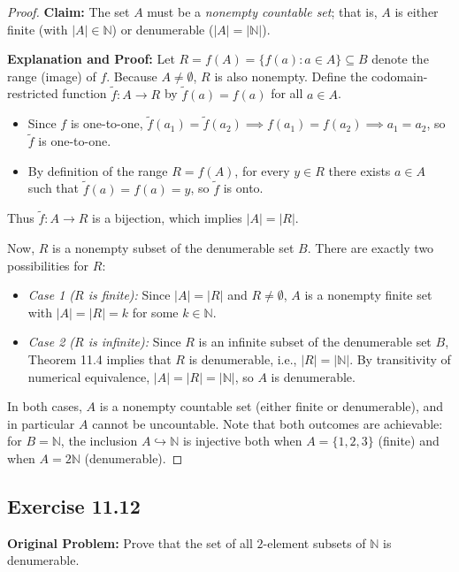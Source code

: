 \documentclass[11pt, letterpaper]{article}
\theoremstyle{definition}
\theoremstyle{remark}
\begin{document}
\begin{proof}
\textbf{Claim:} The set $A$ must be a \emph{nonempty countable set}; that is, $A$ is either finite (with $|A| \in \mathbb{N}$) or denumerable ($|A| = |\mathbb{N}|$).

\textbf{Explanation and Proof:} Let $R = f(A) = \{f(a) : a \in A\} \subseteq B$ denote the range (image) of $f$. Because $A \neq \emptyset$, $R$ is also nonempty. Define the codomain-restricted function $\tilde{f} : A \to R$ by $\tilde{f}(a) = f(a)$ for all $a \in A$.
\begin{itemize}
    \item Since $f$ is one-to-one, $\tilde{f}(a_1) = \tilde{f}(a_2) \implies f(a_1) = f(a_2) \implies a_1 = a_2$, so $\tilde{f}$ is one-to-one.
    \item By definition of the range $R = f(A)$, for every $y \in R$ there exists $a \in A$ such that $\tilde{f}(a) = f(a) = y$, so $\tilde{f}$ is onto.
\end{itemize}
Thus $\tilde{f} : A \to R$ is a bijection, which implies $|A| = |R|$.

Now, $R$ is a nonempty subset of the denumerable set $B$. There are exactly two possibilities for $R$:
\begin{itemize}
    \item \emph{Case 1 ($R$ is finite):} Since $|A| = |R|$ and $R \neq \emptyset$, $A$ is a nonempty finite set with $|A| = |R| = k$ for some $k \in \mathbb{N}$.
    \item \emph{Case 2 ($R$ is infinite):} Since $R$ is an infinite subset of the denumerable set $B$, Theorem 11.4 implies that $R$ is denumerable, i.e., $|R| = |\mathbb{N}|$. By transitivity of numerical equivalence, $|A| = |R| = |\mathbb{N}|$, so $A$ is denumerable.
\end{itemize}
In both cases, $A$ is a nonempty countable set (either finite or denumerable), and in particular $A$ cannot be uncountable. Note that both outcomes are achievable: for $B = \mathbb{N}$, the inclusion $A \hookrightarrow \mathbb{N}$ is injective both when $A = \{1, 2, 3\}$ (finite) and when $A = 2\mathbb{N}$ (denumerable).
\end{proof}

\subsection{Exercise 11.12}

\textbf{Original Problem:} Prove that the set of all $2$-element subsets of $\mathbb{N}$ is denumerable.
\end{document}
